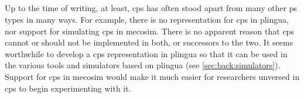 



\subsection{}
Up to the time of writing, at least, \gls{cps} has often stood apart from many other \gls{ps} types in many ways.  For example, there is no representation for \gls{cps} in \gls{plingua}, nor support for simulating \gls{cps} in \gls{mecosim}.  There is no apparent reason that \gls{cps} cannot or should not be implemented in both, or successors to the two.  It seems worthwhile to develop a \gls{cps} representation in \gls{plingua} so that it can be used in the various tools and simulators based on \gls{plingua} (see \vref{sec:back:simulators}).  Support for \gls{cps} in \gls{mecosim} would make it much easier for researchers unversed in \gls{cps} to begin experimenting with it.
